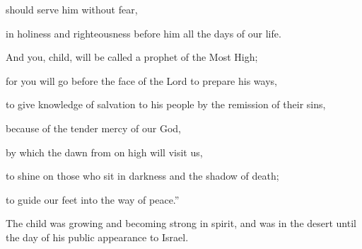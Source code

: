 {\par }{\QB should serve him without fear,
\par }{\QB {}in holiness and righteousness before him all the days of our life.
\par }{\Q {}And you, child, will be called a prophet of the Most High;
\par }{\QB for you will go before the face of the Lord to prepare his ways,
\par }{\QB {}to give knowledge of salvation to his people by the remission of their sins,
\par }{\Q {}because of the tender mercy of our God,
\par }{\QB by which the dawn from on high will visit us,
\par }{\QB {}to shine on those who sit in darkness and the shadow of death;
\par }{\QB to guide our feet into the way of peace.”
\par }{\PP {}The child was growing and becoming strong in spirit, and was in the desert until the day of his public appearance to Israel.

}
